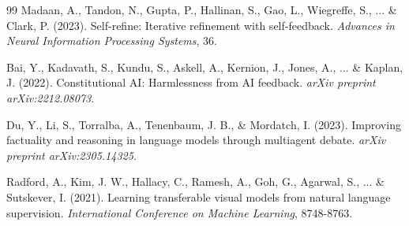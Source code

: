 \documentclass[11pt,a4paper]{article}
\begin{document}
\begin{thebibliography}{99}
Madaan, A., Tandon, N., Gupta, P., Hallinan, S., Gao, L., Wiegreffe, S., ... \& Clark, P. (2023).
Self-refine: Iterative refinement with self-feedback.
\textit{Advances in Neural Information Processing Systems}, 36.

Bai, Y., Kadavath, S., Kundu, S., Askell, A., Kernion, J., Jones, A., ... \& Kaplan, J. (2022).
Constitutional AI: Harmlessness from AI feedback.
\textit{arXiv preprint arXiv:2212.08073}.

Du, Y., Li, S., Torralba, A., Tenenbaum, J. B., \& Mordatch, I. (2023).
Improving factuality and reasoning in language models through multiagent debate.
\textit{arXiv preprint arXiv:2305.14325}.

Radford, A., Kim, J. W., Hallacy, C., Ramesh, A., Goh, G., Agarwal, S., ... \& Sutskever, I. (2021).
Learning transferable visual models from natural language supervision.
\textit{International Conference on Machine Learning}, 8748-8763.

\end{thebibliography}
\end{document}
